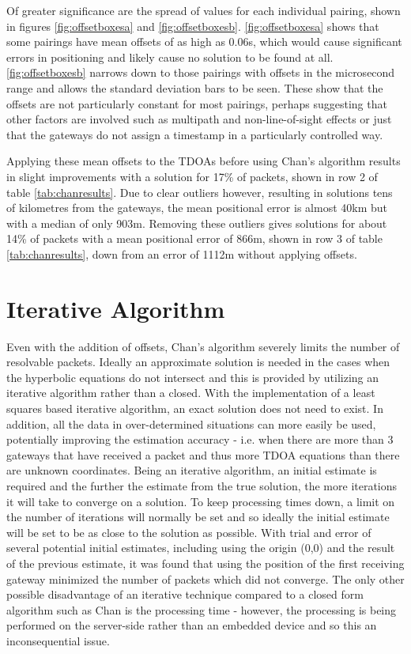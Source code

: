 \documentclass[a4paper]{report}
\begin{document}
    Of greater significance are the spread of values for each individual pairing, shown in figures \ref{fig:offsetboxesa} and \ref{fig:offsetboxesb}. \ref{fig:offsetboxesa} shows that some pairings have mean offsets of as high as 0.06s, which would cause significant errors in positioning and likely cause no solution to be found at all. \ref{fig:offsetboxesb} narrows down to those pairings with offsets in the microsecond range and allows the standard deviation bars to be seen. These show that the offsets are not particularly constant for most pairings, perhaps suggesting that other factors are involved such as multipath and non-line-of-sight effects or just that the gateways do not assign a timestamp in a particularly controlled way.

    Applying these mean offsets to the TDOAs before using Chan's algorithm results in slight improvements with a solution for 17\% of packets, shown in row 2 of table \ref{tab:chanresults}. Due to clear outliers however, resulting in solutions tens of kilometres from the gateways, the mean positional error is almost 40km but with a median of only 903m. Removing these outliers gives solutions for about 14\% of packets with a mean positional error of 866m, shown in row 3 of table \ref{tab:chanresults}, down from an error of 1112m without applying offsets.


  \section{Iterative Algorithm}

    Even with the addition of offsets, Chan's algorithm severely limits the number of resolvable packets. Ideally an approximate solution is needed in the cases when the hyperbolic equations do not intersect and this is provided by utilizing an iterative algorithm rather than a closed. With the implementation of a least squares based iterative algorithm, an exact solution does not need to exist. In addition, all the data in over-determined situations can more easily be used, potentially improving the estimation accuracy - i.e. when there are more than 3 gateways that have received a packet and thus more TDOA equations than there are unknown coordinates. Being an iterative algorithm, an initial estimate is required and the further the estimate from the true solution, the more iterations it will take to converge on a solution. To keep processing times down, a limit on the number of iterations will normally be set and so ideally the initial estimate will be set to be as close to the solution as possible. With trial and error of several potential initial estimates, including using the origin (0,0) and the result of the previous estimate, it was found that using the position of the first receiving gateway minimized the number of packets which did not converge. The only other possible disadvantage of an iterative technique compared to a closed form algorithm such as Chan is the processing time - however, the processing is being performed on the server-side rather than an embedded device and so this an inconsequential issue.
\end{document}
